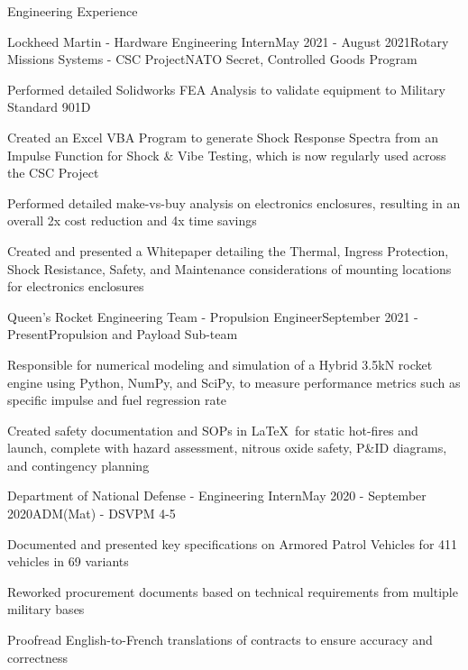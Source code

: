 \documentclass{resume} %
\begin{document}
\begin{rSection}{Engineering Experience}

\begin{rSubsection}{Lockheed Martin - Hardware Engineering Intern}{May 2021 - August 2021}{Rotary Missions Systems - CSC Project}{NATO Secret, Controlled Goods Program}

\item Performed detailed Solidworks FEA Analysis to validate equipment to Military Standard 901D
\item Created an Excel VBA Program to generate Shock Response Spectra from an Impulse Function for Shock \& Vibe Testing, which is now regularly used across the CSC Project
\item Performed detailed make-vs-buy analysis on electronics enclosures, resulting in an overall 2x cost reduction and 4x time savings
\item Created and presented a Whitepaper detailing the Thermal, Ingress Protection, Shock Resistance, Safety, and Maintenance considerations of mounting locations for electronics enclosures

\end{rSubsection}

\begin{rSubsection}{Queen's Rocket Engineering Team - Propulsion Engineer}{September 2021 - Present}{Propulsion and Payload Sub-team}{}

\item Responsible for numerical modeling and simulation of a Hybrid 3.5kN rocket engine using Python, NumPy, and SciPy, to measure performance metrics such as specific impulse and fuel regression rate
\item Created safety documentation and SOPs in \LaTeX\ for static hot-fires and launch, complete with hazard assessment, nitrous oxide safety, P\&ID diagrams, and contingency planning

\end{rSubsection}

\begin{rSubsection}{Department of National Defense - Engineering Intern}{May 2020 - September 2020}{ADM(Mat) - DSVPM 4-5}{}

\item Documented and presented key specifications on Armored Patrol Vehicles for 411 vehicles in 69 variants
\item Reworked procurement documents based on technical requirements from multiple military bases
\item Proofread English-to-French translations of contracts to ensure accuracy and correctness

\end{rSubsection}


\end{rSection}
\end{document}
